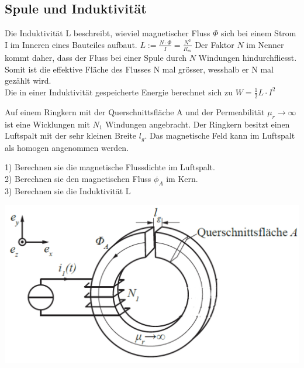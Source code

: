 \newpage

\subsection{Spule und Induktivität}

\beginip
	Die Induktivität L beschreibt, wieviel magnetischer Fluss $\Phi$ sich bei einem Strom I im Inneren eines Bauteiles aufbaut.
	\formulaBegin
	$ \displaystyle L := \frac{N\cdot \Phi}{I} = \frac{N^2}{R_m} $
	\formulaEnd
	Der Faktor $N$ im Nenner kommt daher, dass der Fluss bei einer Spule durch $N$ Windungen hindurchfliesst. Somit ist die effektive Fläche des Flusses N mal grösser, wesshalb er N mal gezählt wird. \\

	Die in einer Induktivität gespeicherte Energie berechnet sich zu
	\formulaBegin
	$W =\displaystyle \frac{1}{2}L \cdot I^2$
	\formulaEnd
\iend



\beginbsp
Auf einem Ringkern mit der Querschnittsfläche A und der Permeabilität $\mu_r \rightarrow \infty$ ist
eine Wicklungen mit $N_1$ Windungen angebracht. Der Ringkern
besitzt einen Luftspalt mit der sehr kleinen Breite $l_g$. Das magnetische Feld kann im
Luftspalt als homogen angenommen werden.

1) Berechnen sie die magnetische Flussdichte im Luftspalt. \\
2) Berechnen sie den magnetischen Fluss $\phi_A$ im Kern.\\
3) Berechnen sie die Induktivität L
\begin{center}

\includegraphics[scale=0.25]{img/induktivitaet_bsp_1.PNG}

\end{center}

